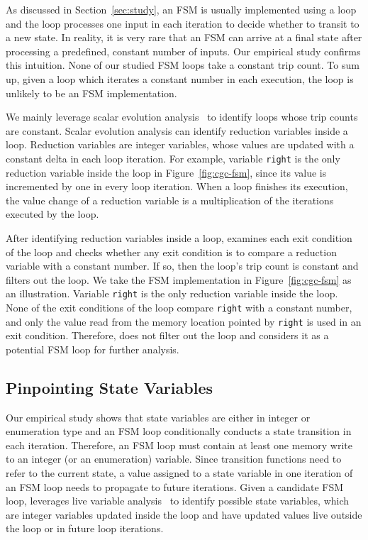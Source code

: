As discussed in Section~\ref{sec:study},
an FSM is usually implemented using a loop 
and the loop processes one input in each iteration to decide 
whether to transit to a new state. 
In reality, it is very rare that an FSM can arrive at a final state 
after processing a predefined, constant number of inputs.
Our empirical study confirms this intuition. 
None of our studied FSM loops take a constant trip count.  
To sum up, given a loop which iterates a constant 
number in each execution, 
the loop is unlikely to be an FSM implementation. 

We mainly leverage scalar evolution analysis~\cite{scalar-1,scalar-2,scalar-3} 
to identify loops whose trip counts are constant. 
Scalar evolution analysis can identify reduction variables inside a loop.
Reduction variables are integer variables, 
whose values are updated 
with a constant delta in each loop iteration. 
For example, variable \texttt{right} is the only reduction 
variable inside the loop in Figure~\ref{fig:cgc-fsm}, 
since its value is incremented by one in every loop iteration.  
When a loop finishes its execution, the value change of a 
reduction variable is a multiplication of 
the iterations executed by the loop. 

After identifying reduction variables inside a loop,
\Tool{} examines each exit condition of the loop and checks whether 
any exit condition is to compare 
a reduction variable with a constant number. 
If so, then the loop's trip count is constant and \Tool{} filters out the loop. 
We take the FSM implementation in Figure~\ref{fig:cgc-fsm} as an illustration.
Variable \texttt{right} is the only reduction variable inside the loop.
None of the exit conditions of the loop compare \texttt{right} with a constant number,
and only the value read from the memory location pointed by \texttt{right} is used 
in an exit condition. 
Therefore, \Tool{} does not filter out the loop and considers it 
as a potential FSM loop for further analysis. 




\subsection{Pinpointing State Variables}
\label{sec:variable}

Our empirical study shows that state variables are either in integer or enumeration type
and an FSM loop conditionally conducts a state transition in each iteration. 
Therefore, an FSM loop must contain at least one memory write to an integer 
(or an enumeration) variable. 
Since transition functions need to refer to the current state, 
a value assigned to a state variable in one iteration of an FSM loop needs 
to propagate to future iterations.
Given a candidate FSM loop, 
\Tool{} leverages live variable 
analysis~\cite{live-analysis} to 
identify possible state variables, which are integer variables 
updated inside the loop and have updated values live outside the loop 
or in future loop iterations. 

